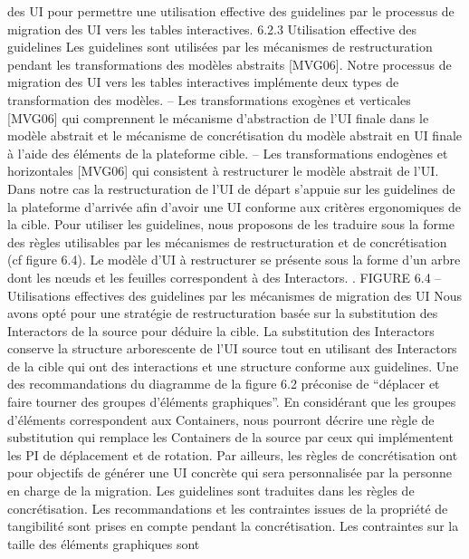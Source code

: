 \documentclass{article}
\begin{document}
des UI pour permettre une utilisation effective des guidelines par le processus de migration des UI
vers les tables interactives.
6.2.3
Utilisation effective des guidelines
Les guidelines sont utilis\'{e}es par les m\'{e}canismes de restructuration pendant les transformations
des mod\`{e}les abstraits [MVG06]. Notre processus de migration des UI vers les tables interactives
impl\'{e}mente deux types de transformation des mod\`{e}les.
– Les transformations exog\`{e}nes et verticales [MVG06] qui comprennent le m\'{e}canisme d’abstraction de l’UI ﬁnale dans le mod\`{e}le abstrait et le m\'{e}canisme de concr\'{e}tisation du mod\`{e}le abstrait
en UI ﬁnale \`{a} l’aide des \'{e}l\'{e}ments de la plateforme cible.
– Les transformations endog\`{e}nes et horizontales [MVG06] qui consistent \`{a} restructurer le mod\`{e}le abstrait de l’UI. Dans notre cas la restructuration de l’UI de d\'{e}part s’appuie sur les guidelines de la plateforme d’arriv\'{e}e aﬁn d’avoir une UI conforme aux crit\`{e}res ergonomiques de la
cible.
Pour utiliser les guidelines, nous proposons de les traduire sous la forme des r\`{e}gles utilisables par
les m\'{e}canismes de restructuration et de concr\'{e}tisation (cf ﬁgure 6.4). Le mod\`{e}le d’UI \`{a} restructurer
se pr\'{e}sente sous la forme d’un arbre dont les nœuds et les feuilles correspondent \`{a} des Interactors. .
FIGURE 6.4 – Utilisations effectives des guidelines par les m\'{e}canismes de migration des UI
Nous avons opt\'{e} pour une strat\'{e}gie de restructuration bas\'{e}e sur la substitution des Interactors de la
source pour d\'{e}duire la cible. La substitution des Interactors conserve la structure arborescente de l’UI
source tout en utilisant des Interactors de la cible qui ont des interactions et une structure conforme
aux guidelines. Une des recommandations du diagramme de la ﬁgure 6.2 pr\'{e}conise de “d\'{e}placer et
faire tourner des groupes d’\'{e}l\'{e}ments graphiques”. En consid\'{e}rant que les groupes d’\'{e}l\'{e}ments correspondent aux Containers, nous pourront d\'{e}crire une r\`{e}gle de substitution qui remplace les Containers
de la source par ceux qui impl\'{e}mentent les PI de d\'{e}placement et de rotation.
Par ailleurs, les r\`{e}gles de concr\'{e}tisation ont pour objectifs de g\'{e}n\'{e}rer une UI concr\`{e}te qui sera
personnalis\'{e}e par la personne en charge de la migration. Les guidelines sont traduites dans les r\`{e}gles
de concr\'{e}tisation. Les recommandations et les contraintes issues de la propri\'{e}t\'{e} de tangibilit\'{e} sont
prises en compte pendant la concr\'{e}tisation. Les contraintes sur la taille des \'{e}l\'{e}ments graphiques sont
\end{document}
